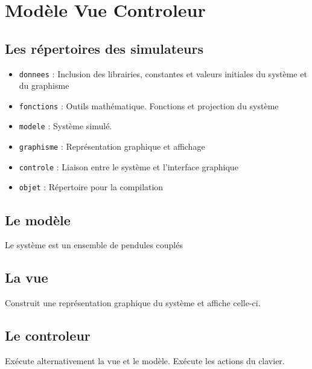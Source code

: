 %
\section{Modèle Vue Controleur}
%
%
\subsection{Les répertoires des simulateurs}
\begin{itemize}[leftmargin=2cm]
\item \texttt{donnees} : Inclusion des librairies, constantes et valeurs initiales du système et du graphisme
\item \texttt{fonctions} : Outils mathématique. Fonctions et projection du système
\item \texttt{modele} : Système simulé. 
\item \texttt{graphisme} : Représentation graphique et affichage
\item \texttt{controle} : Liaison entre le système et l'interface graphique 
\item \texttt{objet} : Répertoire pour la compilation
\end{itemize}
%
\subsection{Le modèle}
Le système est un ensemble de pendules couplés
%
\subsection{La vue}
Construit une représentation graphique du système et affiche celle-ci.
%
\subsection{Le controleur}
Exécute alternativement la vue et le modèle. Exécute les actions du clavier.
%
